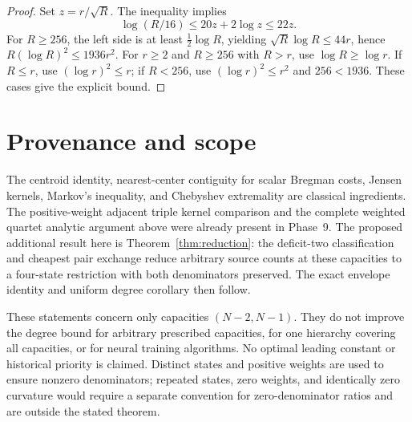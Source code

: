 \documentclass[11pt]{article}
\theoremstyle{remark}\newtheorem{remark}[theorem]{Remark}
\begin{document}
\begin{proof}
Set $z=r/\sqrt R$. The inequality implies
\[
 \log(R/16)\le20z+2\log z\le22z.
\]
For $R\ge256$, the left side is at least $\tfrac12\log R$, yielding
$\sqrt R\log R\le44r$, hence $R(\log R)^2\le1936r^2$.
For $r\ge2$ and $R\ge256$ with $R>r$, use $\log R\ge\log r$.
If $R\le r$, use $(\log r)^2\le r$; if $R<256$, use
$(\log r)^2\le r^2$ and $256<1936$. These cases give the explicit bound.
\end{proof}

\section{Provenance and scope}

The centroid identity, nearest-center contiguity for scalar Bregman
costs, Jensen kernels, Markov's inequality, and Chebyshev extremality
are classical ingredients. The positive-weight adjacent triple kernel
comparison and the complete weighted quartet analytic argument above
were already present in Phase~9. The proposed additional result here is
Theorem~\ref{thm:reduction}: the deficit-two classification and cheapest
pair exchange reduce arbitrary source counts at these capacities to a
four-state restriction with both denominators preserved. The exact
envelope identity and uniform degree corollary then follow.

These statements concern only capacities $(N-2,N-1)$. They do not improve
the degree bound for arbitrary prescribed capacities, for one hierarchy
covering all capacities, or for neural training algorithms. No optimal
leading constant or historical priority is claimed. Distinct states and
positive weights are used to ensure nonzero denominators; repeated states,
zero weights, and identically zero curvature would require a separate
convention for zero-denominator ratios and are outside the stated theorem.
\end{document}

